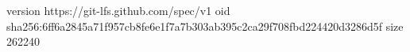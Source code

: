version https://git-lfs.github.com/spec/v1
oid sha256:6ff6a2845a71f957cb8fe6e1f7a7b303ab395c2ca29f708fbd224420d3286d5f
size 262240
